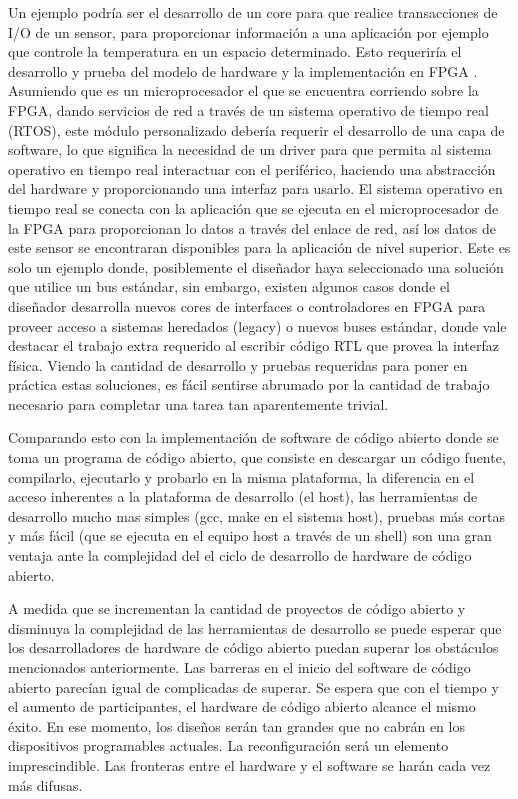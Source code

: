 Un ejemplo podría ser el desarrollo de un core para que realice
transacciones de I/O de un sensor, para proporcionar información a una
aplicación por ejemplo que controle la temperatura en un espacio
determinado. Esto requeriría el desarrollo y prueba del modelo de
hardware y la implementación en FPGA . Asumiendo que es un
microprocesador el que se encuentra corriendo sobre la FPGA, dando
servicios de red a través de un sistema operativo de tiempo real
(RTOS), este módulo personalizado debería requerir el desarrollo de
una capa de software, lo que significa la necesidad de un driver para
que permita al sistema operativo en tiempo real interactuar con el
periférico, haciendo una abstracción del hardware y proporcionando una
interfaz para usarlo. El sistema operativo en tiempo real se conecta
con la aplicación que se ejecuta en el microprocesador de la FPGA para
proporcionan lo datos a través del enlace de red, así los datos de
este sensor se encontraran disponibles para la aplicación de nivel
superior. Este es solo un ejemplo donde, posiblemente el diseñador
haya seleccionado una solución que utilice un bus estándar, sin
embargo, existen algunos casos donde el diseñador desarrolla nuevos
cores de interfaces o controladores en FPGA para proveer acceso a
sistemas heredados (legacy) o nuevos buses estándar, donde vale
destacar el trabajo extra requerido al escribir código RTL que provea
la interfaz física. Viendo la cantidad de desarrollo y pruebas
requeridas para poner en práctica estas soluciones, es fácil sentirse
abrumado por la cantidad de trabajo necesario para completar una tarea
tan aparentemente trivial.

Comparando esto con la implementación de software de código abierto
donde se toma un programa de código abierto, que consiste en descargar
un código fuente, compilarlo, ejecutarlo y probarlo en la misma
plataforma, la diferencia en el acceso inherentes a la plataforma de
desarrollo (el host), las herramientas de desarrollo mucho mas simples
(gcc, make en el sistema host), pruebas más cortas y más fácil (que se
ejecuta en el equipo host a través de un shell) son una gran ventaja
ante la complejidad del el ciclo de desarrollo de hardware de código
abierto.


A medida que se incrementan la cantidad de proyectos de código abierto
y disminuya la complejidad de las herramientas de desarrollo se puede
esperar que los desarrolladores de hardware de código abierto puedan
superar los obstáculos mencionados anteriormente. Las barreras en el
inicio del software de código abierto parecían igual de complicadas de
superar. Se espera que con el tiempo y el aumento de participantes, el
hardware de código abierto alcance el mismo éxito. En ese momento, los
diseños serán tan grandes que no cabrán en los dispositivos
programables actuales. La reconfiguración será un elemento
imprescindible. Las fronteras entre el hardware y el software se harán
cada vez más difusas.

